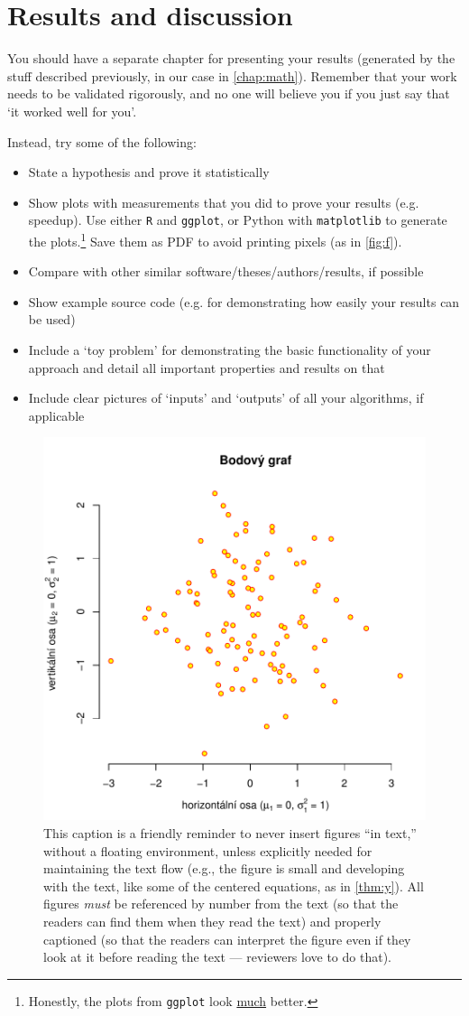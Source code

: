 \chapter{Results and discussion}

You should have a separate chapter for presenting your results (generated by the stuff described previously, in our case in \cref{chap:math}). Remember that your work needs to be validated rigorously, and no one will believe you if you just say that `it worked well for you'.

Instead, try some of the following:
\begin{itemize}
\item State a hypothesis and prove it statistically
\item Show plots with measurements that you did to prove your results (e.g. speedup). Use either \texttt{R} and \texttt{ggplot}, or Python with \texttt{matplotlib} to generate the plots.\footnote{Honestly, the plots from \texttt{ggplot} look \underline{much} better.} Save them as PDF to avoid printing pixels (as in \cref{fig:f}).
\item Compare with other similar software/theses/authors/results, if possible
\item Show example source code (e.g. for demonstrating how easily your results can be used)
\item Include a `toy problem' for demonstrating the basic functionality of your approach and detail all important properties and results on that
\item Include clear pictures of `inputs' and `outputs' of all your algorithms, if applicable
\end{itemize}

\begin{figure}
\centering
\includegraphics[width=.6\linewidth]{img/ukazka-obr01.pdf}
\caption{This caption is a friendly reminder to never insert figures ``in text,'' without a floating environment, unless explicitly needed for maintaining the text flow (e.g., the figure is small and developing with the text, like some of the centered equations, as in \cref{thm:y}). All figures \emph{must} be referenced by number from the text (so that the readers can find them when they read the text) and properly captioned (so that the readers can interpret the figure even if they look at it before reading the text --- reviewers love to do that).}
\end{figure}

